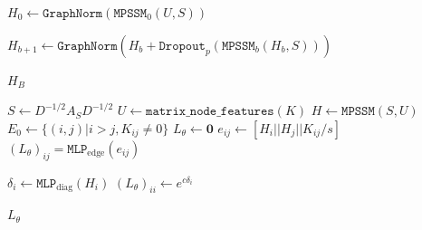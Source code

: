 %
%
%
%

\begin{algorithm}[H]
    \caption{MPSSM}
    \label{alg:mpssm}
    \begin{algorithmic}[1]
        \State $H_0 \gets \texttt{GraphNorm}(\texttt{MPSSM}_0(U,S))$

        \State $H_{b + 1} \gets \texttt{GraphNorm}(H_b + \texttt{Dropout}_p(\texttt{MPSSM}_b(H_b,S)))$
        \EndFor

        \State \Return $H_{B}$

    \end{algorithmic}
\end{algorithm}

%
%
%
%
%
%
%
%
%
%

\begin{algorithm}[H]
    \caption{MPSSM-PCG}
    \label{alg:mpssm_pcg}
    \begin{algorithmic}[1]
        \State $S \gets D^{-1/2}A_SD^{-1/2}$ 
        \State $U \gets \texttt{matrix\_node\_features}(K)$ 
        \State $H \gets \texttt{MPSSM}(S,U)$
        \State $E_0 \gets \{(i,j) | i > j, K_{ij} \neq 0\}$
        \State $L_\theta \gets \mathbf{0}$
        \State $e_{ij}\gets [H_i || H_j || K_{ij} / s]$
        \State $(L_\theta)_{ij} = \texttt{MLP}_{\text{edge}}(e_{ij})$
        \EndFor

        \State $\delta_i \gets \texttt{MLP}_{\text{diag}}(H_i)$
        \State $(L_\theta)_{ii} \gets e^{c\delta_i}$ 
        \EndFor

        \State \Return $L_\theta$
    \end{algorithmic}
\end{algorithm}

